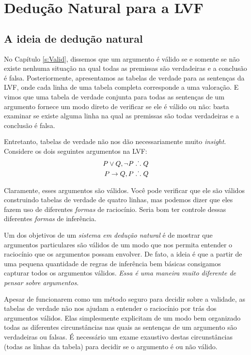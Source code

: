 \part{Dedução Natural para a LVF}
\label{ch.NDTFL}

 
\chapter{A ideia de dedução natural}\label{s:NDVeryIdea}

No  Capítulo  \ref{s:Valid}, dissemos que um argumento é válido se e somente se não existe nenhuma situação na qual todas as premissas são verdadeiras e a conclusão é falsa. Posteriormente,  apresentamos as tabelas de verdade para as sentenças da LVF, onde  cada linha de uma tabela completa corresponde a uma valoração. E vimos que uma tabela de verdade conjunta para todas as sentenças de um argumento fornece um modo direto de verificar se ele é válido ou não: basta examinar se existe alguma linha na qual as premissas são todas verdadeiras e a conclusão é falsa.

Entretanto, tabelas de verdade não nos dão necessariamente muito \emph{insight}. Considere os dois seguintes argumentos na LVF:
\begin{align*}
P \vee Q, \neg P & \mathrel{\ldotp\dot{}\,\ldotp} Q\\
P \rightarrow Q, P & \mathrel{\ldotp\dot{}\,\ldotp} Q
\end{align*}

Claramente, esses argumentos são válidos. Você  pode verificar que ele são válidos construindo tabelas de verdade de quatro linhas, mas podemos dizer que eles fazem uso de diferentes \emph{formas}  de raciocínio. Seria bom ter controle dessas diferentes \emph{formas}  de inferência.

Um dos objetivos de um \emph{sistema em dedução natural} é de mostrar que argumentos particulares são  válidos de um modo que nos permita entender o raciocínio que os argumentos possam envolver.  De fato, a ideia é que a partir de uma pequena quantidade de regras de inferência bem básicas consigamos capturar todos os argumentos válidos.
\emph{Essa é uma maneira muito diferente de pensar sobre argumentos.} 

Apesar de funcionarem como um método seguro para decidir sobre a validade, as tabelas de verdade não nos ajudam a entender o raciocínio por trás dos argumentos válidos. Elas simplesmente explicitam de um modo bem organizado todas as diferentes circunstâncias nas quais as sentenças de um argumento são verdadeiras ou falsas. É necessário um exame exaustivo destas circunstâncias (todas as linhas da tabela) para decidir se o argumento é ou não válido.

